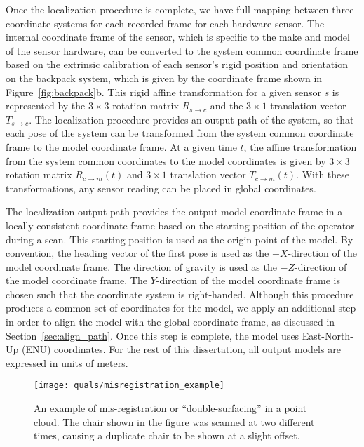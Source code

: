 \documentclass[12pt,onecolumn,oneside]{book}
\begin{document}
Once the localization procedure is complete, we have full mapping between three coordinate systems for each recorded frame for each hardware sensor.  The internal coordinate frame of the sensor, which is specific to the make and model of the sensor hardware, can be converted to the system common coordinate frame based on the extrinsic calibration of each sensor's rigid position and orientation on the backpack system, which is given by the coordinate frame shown in Figure~\ref{fig:backpack}b.  This rigid affine transformation for a given sensor $s$ is represented by the $3 \times 3$ rotation matrix $R_{s\rightarrow c}$ and the $3 \times 1$ translation vector $T_{s\rightarrow c}$.  The localization procedure provides an output path of the system, so that each pose of the system can be transformed from the system common coordinate frame to the model coordinate frame.  At a given time $t$, the affine transformation from the system common coordinates to the model coordinates is given by $3 \times 3$ rotation matrix $R_{c\rightarrow m}(t)$ and $3 \times 1$ translation vector $T_{c\rightarrow m}(t)$.  With these transformations, any sensor reading can be placed in global coordinates.

The localization output path provides the output model coordinate frame in a locally consistent coordinate frame based on the starting position of the operator during a scan.  This starting position is used as the origin point of the model.  By convention, the heading vector of the first pose is used as the $+X$-direction of the model coordinate frame.  The direction of gravity is used as the $-Z$-direction of the model coordinate frame.  The $Y$-direction of the model coordinate frame is chosen such that the coordinate system is right-handed.  Although this procedure produces a common set of coordinates for the model, we apply an additional step in order to align the model with the global coordinate frame, as discussed in Section~\ref{sec:align_path}.  Once this step is complete, the model uses East-North-Up (ENU) coordinates.  For the rest of this dissertation, all output models are expressed in units of meters.

\begin{figure}
	\centerline{\texttt{[image: quals/misregistration\_example]}}
	\caption[An example of mis-registration or ``double-surfacing'' in a point cloud.]{An example of mis-registration or ``double-surfacing'' in a point cloud.   The chair shown in the figure was scanned at two different times, causing a duplicate chair to be shown at a slight offset.}
	\label{fig:double_surface}
\end{figure}
\end{document}
